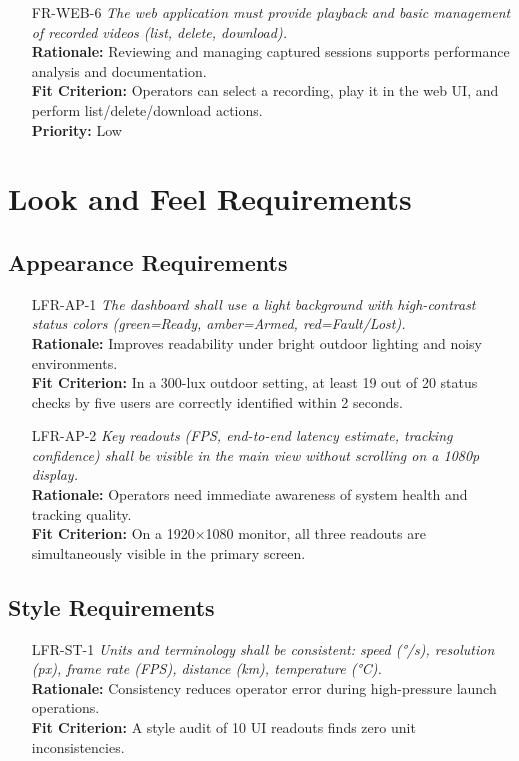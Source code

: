 \documentclass[12pt]{article}
\begin{document}
\begin{itemize}
\item[FR-WEB-6] \emph{The web application must provide playback and basic management of recorded videos (list, delete, download).}\\[2mm]
  {\bf Rationale:} Reviewing and managing captured sessions supports performance analysis and documentation.\\
  {\bf Fit Criterion:} Operators can select a recording, play it in the web UI, and perform list/delete/download actions.\\
  {\bf Priority:} Low



\end{itemize}





\section{Look and Feel Requirements}
\subsection{Appearance Requirements}
\begin{itemize}[leftmargin=*]
  \item[LFR-AP-1] \emph{The dashboard shall use a light background with high-contrast status colors (green=Ready, amber=Armed, red=Fault/Lost).}\\
  \textbf{Rationale:} Improves readability under bright outdoor lighting and noisy environments.\\
  \textbf{Fit Criterion:} In a 300-lux outdoor setting, at least 19 out of 20 status checks by five users are correctly identified within 2 seconds.

  \item[LFR-AP-2] \emph{Key readouts (FPS, end-to-end latency estimate, tracking confidence) shall be visible in the main view without scrolling on a 1080p display.}\\
  \textbf{Rationale:} Operators need immediate awareness of system health and tracking quality.\\
  \textbf{Fit Criterion:} On a 1920×1080 monitor, all three readouts are simultaneously visible in the primary screen.
\end{itemize}

\subsection{Style Requirements}
\begin{itemize}[leftmargin=*]
  \item[LFR-ST-1] \emph{Units and terminology shall be consistent: speed (°/s), resolution (px), frame rate (FPS), distance (km), temperature (°C).}\\
  \textbf{Rationale:} Consistency reduces operator error during high-pressure launch operations.\\
  \textbf{Fit Criterion:} A style audit of 10 UI readouts finds zero unit inconsistencies.
\end{itemize}
\end{document}
